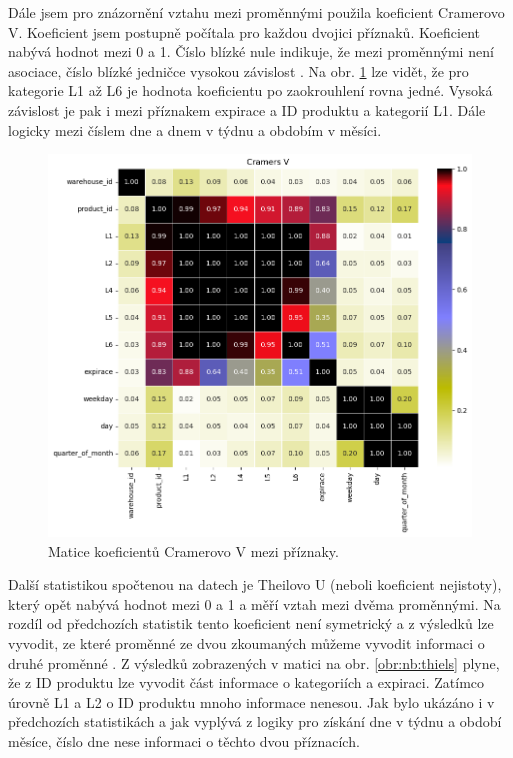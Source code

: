 Dále jsem pro znázornění vztahu mezi proměnnými použila koeficient Cramerovo V. Koeficient jsem postupně počítala pro každou dvojici příznaků. Koeficient nabývá hodnot mezi 0 a 1. Číslo blízké nule indikuje, že mezi proměnnými není asociace, číslo blízké jedničce vysokou závislost \cite{bib:statology}. Na obr. \ref*{obr:nb:cramers} lze vidět, že pro kategorie L1 až L6 je hodnota koeficientu  po zaokrouhlení rovna jedné. Vysoká závislost je pak i mezi příznakem expirace a ID produktu a kategorií L1. Dále logicky mezi číslem dne a dnem v týdnu a obdobím v měsíci.
\begin{figure}[hbtp!]
    \centering
    \includegraphics[width=.8\textwidth]{obrazky/zntb/cramers_u.png}
    \caption{Matice koeficientů Cramerovo V mezi příznaky.}
    \label{obr:nb:cramers}
\end{figure}

Další statistikou spočtenou na datech je Theilovo U (neboli koeficient nejistoty), který opět nabývá hodnot mezi 0 a 1 a měří vztah mezi dvěma proměnnými. Na rozdíl od předchozích statistik tento koeficient není symetrický a z výsledků lze vyvodit, ze které proměnné ze dvou zkoumaných můžeme vyvodit informaci o druhé proměnné \cite{bib:correl}. Z výsledků zobrazených v matici na obr. \ref*{obr:nb:thiels} plyne, že z ID produktu lze vyvodit část informace o kategoriích a expiraci. Zatímco úrovně L1 a L2 o ID produktu mnoho informace nenesou. Jak bylo ukázáno i v předchozích statistikách a jak vyplývá z logiky pro získání dne v týdnu a období měsíce, číslo dne nese informaci o těchto dvou příznacích.


